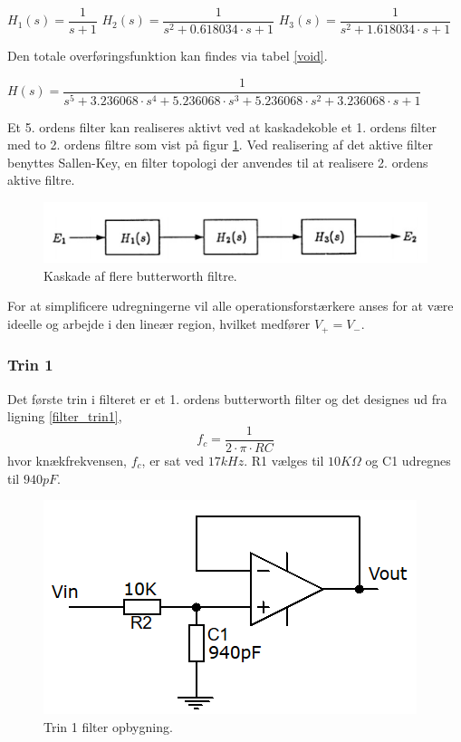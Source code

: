 \begin{center}
 $H_1(s) = \dfrac{1}{s+1}$ \hspace{1.5cm}
 $H_2(s) = \dfrac{1}{s^2 + 0.618034\cdot s + 1}$ \hspace{1.5cm}
 $H_3(s) = \dfrac{1}{s^2 + 1.618034\cdot s + 1}$
\end{center}

Den totale overføringsfunktion kan findes via tabel \ref{void}.\\ 
\begin{center}
 $H(s) = \dfrac{1}{s^5+3.236068\cdot s^4 + 5.236068\cdot s^3 + 5.236068\cdot s^2 + 3.236068\cdot s +1}$
\end{center}
Et 5. ordens filter kan realiseres aktivt ved at kaskadekoble et 1. ordens filter med to 2. ordens filtre som vist på figur  \ref{fig::anfilter_kask_butterworth}. Ved realisering af det aktive filter benyttes Sallen-Key, en filter topologi der anvendes til at realisere 2. ordens aktive filtre. 

\begin{figure}[h!]
	\centering
	\includegraphics[scale=0.7]{./billeder/Kaskade}
	\caption{Kaskade af flere butterworth filtre.}
	\label{fig::anfilter_kask_butterworth}
\end{figure}
\FloatBlock

For at simplificere udregningerne vil alle operationsforstærkere anses for at være ideelle og arbejde i den lineær region, hvilket medfører $V_+ = V_-$.

\subsubsection{Trin 1} 
Det første trin i filteret er et 1. ordens butterworth filter og det designes ud fra ligning \ref{filter_trin1},
\begin{equation}
	f_c = \dfrac{1}{2\cdot\pi\cdot R C} \label{filter_trin1}
\end{equation} 	
hvor knækfrekvensen, $f_c$, er sat ved $17kHz$.
R1 vælges til $10K\Omega$ og C1 udregnes til $940pF$.
\begin{figure}[h!]
	\centering
	\includegraphics[scale=0.3]{./billeder/stage1}
	\caption{Trin 1 filter opbygning.}
	\label{fig::stage1}
\end{figure}

